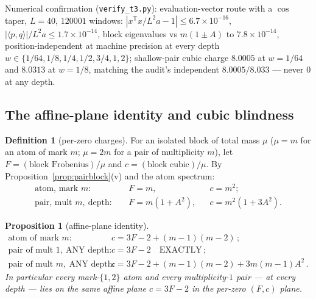 \documentclass[11pt]{article}
\theoremstyle{plain}
\newtheorem{proposition}[theorem]{Proposition}
\theoremstyle{definition}
\newtheorem*{defn}{Definition}
\theoremstyle{remark}
\begin{document}
Numerical confirmation (\texttt{verify\_t3.py}): evaluation-vector
route with a $\cos$ taper, $L = 40$, $120001$ windows:
$|x^{\mathsf{T}} x / L^2 a - 1| \le 6.7 \times 10^{-16}$,
$|\langle p, q\rangle|/L^2 a \le 1.7 \times 10^{-14}$, block eigenvalues vs
$m(1 \pm A)$ to $7.8 \times 10^{-14}$, position-independent at machine precision
at every depth $w \in \{1/64, 1/8, 1/4, 1/2, 3/4, 1, 2\}$; shallow-pair cubic
charge $8.0005$ at $w = 1/64$ and $8.0313$ at $w = 1/8$, matching the audit's
independent $8.0005 / 8.033$ --- never $0$ at any depth.

\subsection{The affine-plane identity and cubic blindness}

\begin{defn}[per-zero charges]
For an isolated block of total mass $\mu$ ($\mu = m$ for an atom of mark $m$;
$\mu = 2m$ for a pair of multiplicity $m$), let
$F = (\text{block Frobenius})/\mu$ and $c = (\text{block cubic})/\mu$. By
Proposition~\ref{prop:pairblock}(v) and the atom spectrum:
\begin{align*}
  \text{atom, mark } m: &\quad F = m, && c = m^2;\\
  \text{pair, mult } m,\ \text{depth}: &\quad F = m(1 + A^2),
    && c = m^2(1 + 3A^2).
\end{align*}
\end{defn}

\begin{proposition}[affine-plane identity]
\label{prop:affine}
\begin{align*}
  \text{atom of mark } m: &\quad c = 3F - 2 + (m-1)(m-2)\,;\\
  \text{pair of mult } 1,\ \text{ANY depth}: &\quad c = 3F - 2 \quad\text{EXACTLY}\,;\\
  \text{pair of mult } m,\ \text{ANY depth}: &\quad
    c = 3F - 2 + (m-1)(m-2) + 3m(m-1)A^2 \,.
\end{align*}
In particular every mark-$\{1,2\}$ atom and every multiplicity-$1$ pair --- at
every depth --- lies on the same affine plane $c = 3F - 2$ in the per-zero
$(F, c)$ plane.
\end{proposition}
\end{document}
